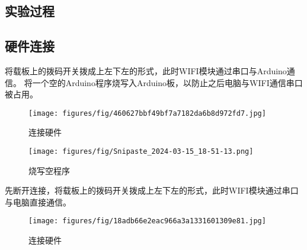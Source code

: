 \documentclass[12pt,hyperref,a4paper,UTF8]{ctexart}
\begin{document}
\subsection{实验过程}
\subsection*{硬件连接}
    将载板上的拨码开关拨成上左下左的形式，此时WIFI模块通过串口与Arduino通信。
    将一个空的Arduino程序烧写入Arduino板，以防止之后电脑与WIFI通信串口被占用。\\
    \begin{figure}[H]
        \centering
        \texttt{[image: figures/fig/460627bbf49bf7a7182da6b8d972fd7.jpg]}
        \caption{连接硬件}
        \label{fig:enter-label}
    \end{figure}
    \begin{figure}[H]
        \centering
        \texttt{[image: figures/fig/Snipaste\_2024-03-15\_18-51-13.png]}
        \caption{烧写空程序}
        \label{fig:enter-label}
    \end{figure}
    先断开连接，将载板上的拨码开关拨成上左下左的形式，此时WIFI模块通过串口与电脑直接通信。
    \begin{figure}[H]
        \centering
        \texttt{[image: figures/fig/18adb66e2eac966a3a1331601309e81.jpg]}
        \caption{连接硬件}
        \label{fig:enter-label}
    \end{figure}
\end{document}
